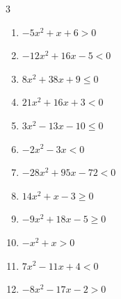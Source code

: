 \begin{multicols}{3}
\begin{enumerate}

  \item $-5x^{2}+x+6>0$


  \item $-12x^{2}+16x-5<0$


  \item $8x^{2}+38x+9\leq 0$


  \item $21x^{2}+16x+3<0$


  \item $3x^{2}-13x-10\leq 0$


  \item $-2x^{2}-3x<0$


  \item $-28x^{2}+95x-72<0$


\columnbreak %

  \item $14x^{2}+x-3\geq 0$


  \item $-9x^{2}+18x-5\geq 0$


  \item $-x^{2}+x>0$

        \phantom{$\displaystyle 0 < x < 1$}

  \item $7x^{2}-11x+4<0$


  \item $-8x^{2}-17x-2>0$


\end{enumerate}
\end{multicols}

